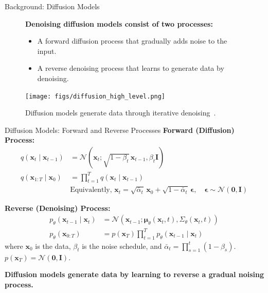 \begin{refsection}
\begin{frame}{Background: Diffusion Models}

  \begin{figure}
    \begin{minipage}{0.95\linewidth}
      \footnotesize
      \textbf{Denoising diffusion models consist of two processes:}
      \begin{itemize}
        \item A forward diffusion process that gradually adds noise to the input.
        \item A reverse denoising process that learns to generate data by denoising.
      \end{itemize}
    \end{minipage}
    \vspace{2em}

    \centering
    \texttt{[image: figs/diffusion\_high\_level.png]}

    \caption[]{\scriptsize Diffusion models generate data through iterative denoising~\parencite{sohl2015deep,ho2020denoising}.}
  \end{figure}

  \bottomleftrefs
\end{frame}
\end{refsection}

\begin{refsection}
\begin{frame}{Diffusion Models: Forward and Reverse Processes}
  \footnotesize
  \textbf{Forward (Diffusion) Process:}
  \begin{align*}
    q(\mathbf{x}_t \mid \mathbf{x}_{t-1}) &= \mathcal{N}(\mathbf{x}_t; \sqrt{1-\beta_t}\,\mathbf{x}_{t-1}, \beta_t \mathbf{I}) \\
    q(\mathbf{x}_{1:T} \mid \mathbf{x}_0) &= \prod_{t=1}^T q(\mathbf{x}_t \mid \mathbf{x}_{t-1}) \\
    &\text{Equivalently,  } 
    \mathbf{x}_t = \sqrt{\bar{\alpha}_t}\,\mathbf{x}_0 + \sqrt{1-\bar{\alpha}_t}\,\boldsymbol{\epsilon}, \quad \boldsymbol{\epsilon} \sim \mathcal{N}(\mathbf{0}, \mathbf{I})
  \end{align*}

  \footnotesize
  \textbf{Reverse (Denoising) Process:}
  \begin{align*}
    p_\theta(\mathbf{x}_{t-1} \mid \mathbf{x}_t) &= \mathcal{N}(\mathbf{x}_{t-1}; \boldsymbol{\mu}_\theta(\mathbf{x}_t, t), \Sigma_\theta(\mathbf{x}_t, t)) \\
    p_\theta(\mathbf{x}_{0:T}) &= p(\mathbf{x}_T) \prod_{t=1}^T p_\theta(\mathbf{x}_{t-1} \mid \mathbf{x}_t)
  \end{align*}
  \scriptsize
  where $\mathbf{x}_0$ is the data, $\beta_t$ is the noise schedule, and $\bar{\alpha}_t = \prod_{s=1}^t (1-\beta_s)$. $p(\mathbf{x}_T) = \mathcal{N}(\mathbf{0}, \mathbf{I})$.

  \scriptsize
  \textbf{Diffusion models generate data by learning to reverse a gradual noising process.}~\parencite{sohl2015deep,ho2020denoising}
  \bottomleftrefs
\end{frame}
\end{refsection}

